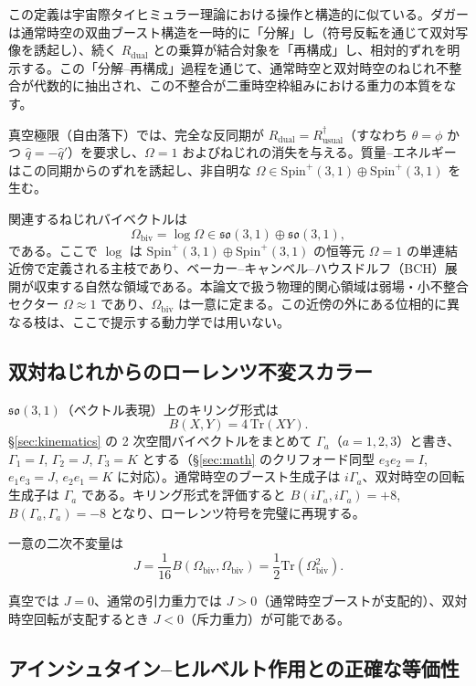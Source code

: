 \documentclass[a4paper]{article}
\begin{document}
この定義は宇宙際タイヒミュラー理論における操作と構造的に似ている。ダガーは通常時空の双曲ブースト構造を一時的に「分解」し（符号反転を通じて双対写像を誘起し）、続く $R_\text{dual}$ との乗算が結合対象を「再構成」し、相対的ずれを明示する。この「分解--再構成」過程を通じて、通常時空と双対時空のねじれ不整合が代数的に抽出され、この不整合が二重時空枠組みにおける重力の本質をなす。

真空極限（自由落下）では、完全な反同期が $R_\text{dual} = R_\text{usual}^\dagger$（すなわち $\theta = \phi$ かつ $\hat{q} = -\hat{q}'$）を要求し、$\Omega = 1$ およびねじれの消失を与える。質量--エネルギーはこの同期からのずれを誘起し、非自明な $\Omega \in \mathrm{Spin}^+(3,1) \oplus \mathrm{Spin}^+(3,1)$ を生む。

関連するねじれバイベクトルは
\[
\Omega_\text{biv} = \log \Omega \in \mathfrak{so}(3,1) \oplus \mathfrak{so}(3,1),
\]
である。ここで $\log$ は $\mathrm{Spin}^+(3,1) \oplus \mathrm{Spin}^+(3,1)$ の恒等元 $\Omega = 1$ の単連結近傍で定義される主枝であり、ベーカー--キャンベル--ハウスドルフ（BCH）展開が収束する自然な領域である。本論文で扱う物理的関心領域は弱場・小不整合セクター $\Omega \approx 1$ であり、$\Omega_\text{biv}$ は一意に定まる。この近傍の外にある位相的に異なる枝は、ここで提示する動力学では用いない。

\subsection{双対ねじれからのローレンツ不変スカラー}

$\mathfrak{so}(3,1)$（ベクトル表現）上のキリング形式は
\[
B(X,Y) = 4\,\mathrm{Tr}(X Y).
\]
\S\ref{sec:kinematics} の 2 次空間バイベクトルをまとめて $\Gamma_a$（$a=1,2,3$）と書き、$\Gamma_1 = I$, $\Gamma_2 = J$, $\Gamma_3 = K$ とする（\S\ref{sec:math} のクリフォード同型 $e_3e_2 = I$, $e_1e_3 = J$, $e_2e_1 = K$ に対応）。通常時空のブースト生成子は $i\Gamma_a$、双対時空の回転生成子は $\Gamma_a$ である。キリング形式を評価すると $B(i\Gamma_a, i\Gamma_a) = +8$, $B(\Gamma_a, \Gamma_a) = -8$ となり、ローレンツ符号を完璧に再現する。

一意の二次不変量は
\[
J = \frac{1}{16} B(\Omega_\text{biv}, \Omega_\text{biv}) = \frac{1}{2} \mathrm{Tr}(\Omega_\text{biv}^2).
\]

真空では $J = 0$、通常の引力重力では $J > 0$（通常時空ブーストが支配的）、双対時空回転が支配するとき $J < 0$（斥力重力）が可能である。

\subsection{アインシュタイン--ヒルベルト作用との正確な等価性}
\end{document}
